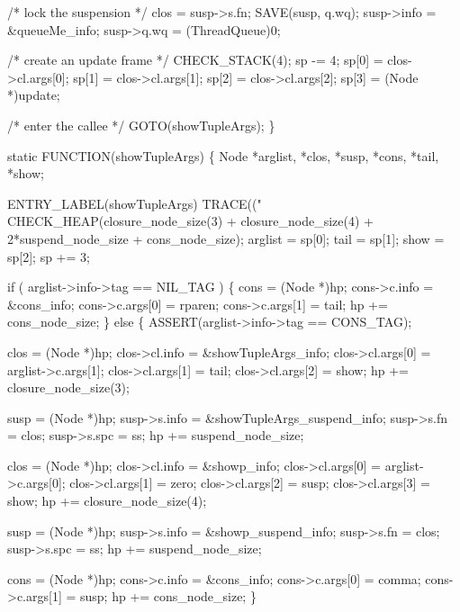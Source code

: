     /* lock the suspension */
    clos = susp->s.fn;
    SAVE(susp, q.wq);
    susp->info = &queueMe_info;
    susp->q.wq = (ThreadQueue)0;

    /* create an update frame */
    CHECK_STACK(4);
    sp   -= 4;
    sp[0] = clos->cl.args[0];
    sp[1] = clos->cl.args[1];
    sp[2] = clos->cl.args[2];
    sp[3] = (Node *)update;

    /* enter the callee */
    GOTO(showTupleArgs);
\}

static
FUNCTION(showTupleArgs)
\{
    Node *arglist, *clos, *susp, *cons, *tail, *show;

 ENTRY_LABEL(showTupleArgs)
    TRACE(("%
    CHECK_HEAP(closure_node_size(3) + closure_node_size(4)
               + 2*suspend_node_size + cons_node_size);
    arglist = sp[0];
    tail    = sp[1];
    show    = sp[2];
    sp     += 3;

    if ( arglist->info->tag == NIL_TAG )
    \{
        cons            = (Node *)hp;
        cons->c.info    = &cons_info;
        cons->c.args[0] = rparen;
        cons->c.args[1] = tail;
        hp             += cons_node_size;
    \}
    else
    \{
        ASSERT(arglist->info->tag == CONS_TAG);

        clos             = (Node *)hp;
        clos->cl.info    = &showTupleArgs_info;
        clos->cl.args[0] = arglist->c.args[1];
        clos->cl.args[1] = tail;
        clos->cl.args[2] = show;
        hp              += closure_node_size(3);

        susp         = (Node *)hp;
        susp->s.info = &showTupleArgs_suspend_info;
        susp->s.fn   = clos;
        susp->s.spc  = ss;
        hp          += suspend_node_size;

        clos             = (Node *)hp;
        clos->cl.info    = &showp_info;
        clos->cl.args[0] = arglist->c.args[0];
        clos->cl.args[1] = zero;
        clos->cl.args[2] = susp;
        clos->cl.args[3] = show;
        hp              += closure_node_size(4);

        susp         = (Node *)hp;
        susp->s.info = &showp_suspend_info;
        susp->s.fn   = clos;
        susp->s.spc  = ss;
        hp          += suspend_node_size;

        cons            = (Node *)hp;
        cons->c.info    = &cons_info;
        cons->c.args[0] = comma;
        cons->c.args[1] = susp;
        hp             += cons_node_size;
    \}

